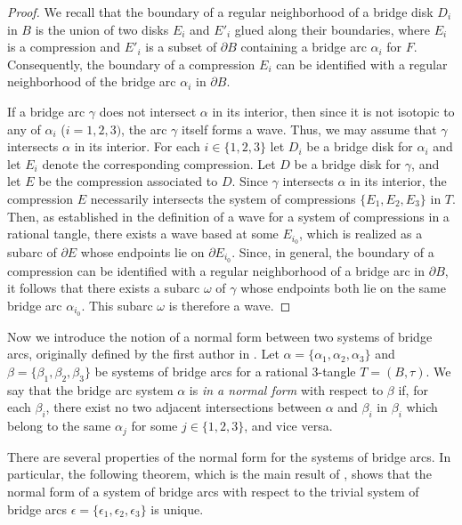 \documentclass[12pt]{amsart}
\newcommand{\al}{\alpha}
\newcommand{\ep}{\epsilon}
\begin{document}
\begin{proof}
We recall that the boundary of a regular neighborhood of a bridge disk $D_i$ in $B$ is the union
of two disks $E_i$ and $E'_i$ glued along their boundaries, where $E_i$ is a compression and $E'_i$ is a subset of $\partial B$ containing a bridge arc $\alpha_i$ for $F$.
Consequently, the boundary of a compression $E_i$ can be identified with a regular neighborhood of the bridge arc $\alpha_i$ in $\partial B$.

If a bridge arc $\gamma$ does not intersect $\alpha$ in its interior, then since it is not isotopic to any of $\alpha_i$ ($i=1, 2, 3)$, the arc $\gamma$ itself forms a wave.
Thus, we may assume that $\gamma$ intersects $\alpha$ in its interior. For each $i\in\{1, 2, 3\}$ let $D_i$ be a bridge disk for $\alpha_i$ and let $E_i$ denote the corresponding compression. Let $D$ be a bridge disk for $\gamma$, and let $E$ be the compression associated to $D$.
Since $\gamma$ intersects $\alpha$ in its interior, the compression $E$ necessarily intersects the system of compressions $\{E_1, E_2, E_3\}$ in $T$.
Then, as established in the definition of a wave for a system of compressions in a rational tangle, there exists a wave based at some $E_{i_0}$, which
is realized as a subarc of $\partial E$ whose endpoints lie on $\partial E_{i_0}$. Since, in general, the boundary of a compression can be identified with a regular neighborhood of a bridge arc in $\partial B$, it follows that there exists a subarc $\omega$ of $\gamma$ whose endpoints both lie on the same bridge arc $\al_{i_0}$. This subarc $\omega$ is therefore a wave.
\end{proof}


Now we introduce the notion of a normal form between two systems of bridge arcs, originally defined by the first author in \cite{K24}.
Let $\alpha=\{\alpha_1,\alpha_2,\alpha_3\}$ and $\beta=\{\beta_1,\beta_2,\beta_3\}$ be systems of bridge arcs for a rational 3-tangle $T = (B,\tau)$.
We say that the bridge arc system $\alpha$ is \textit{in a normal form} with respect to $\beta$ if, for each $\beta_i$, there exist no two adjacent
intersections between $\alpha$ and $\beta_i$ in $\beta_i$ which belong to the same $\alpha_j$ for some $j\in\{1, 2, 3\}$, and vice versa.


There are several properties of the normal form for the systems of bridge arcs.
In particular, the following theorem, which is the main result of \cite{K24},
shows that the normal form of a system of bridge arcs with respect to the trivial system of bridge arcs $\ep=\{\ep_1, \ep_2, \ep_3\}$
is unique.
\end{document}
